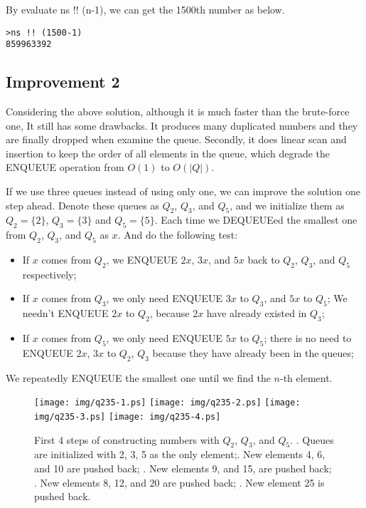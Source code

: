 \documentclass{article}
\begin{document}
By evaluate ns !! (n-1), we can get the 1500th number as
below.

\begin{verbatim}
>ns !! (1500-1)
859963392
\end{verbatim}

\subsection{Improvement 2}
Considering the above solution, although it is much faster than the brute-force one,
It still has some drawbacks. It produces many duplicated numbers and they are
finally dropped when examine the queue. Secondly, it does linear scan and insertion
to keep the order of all elements in the queue, which degrade the ENQUEUE operation
from $O(1)$ to $O(|Q|)$.

If we use three queues instead of using only one, we can improve the solution one
step ahead. Denote these queues as $Q_2$, $Q_3$, and $Q_5$, and we initialize
them as $Q_2=\{ 2 \}$, $Q_3 = \{ 3\}$ and $Q_5 = \{ 5 \}$. Each time we DEQUEUEed
the smallest one from $Q_2$, $Q_3$, and $Q_5$ as $x$. And do the following test:

\begin{itemize}
\item If $x$ comes from $Q_2$, we ENQUEUE $2x$, $3x$, and $5x$ back to
$Q_2$, $Q_3$, and $Q_5$ respectively;
\item If $x$ comes from $Q_3$, we only need ENQUEUE $3x$ to $Q_3$, and $5x$ to $Q_5$;
We needn't ENQUEUE $2x$ to $Q_2$, because $2x$ have already existed in $Q_3$;
\item If $x$ comes from $Q_5$, we only need ENQUEUE $5x$ to $Q_5$; there is
no need to ENQUEUE $2x$, $3x$ to $Q_2$, $Q_3$ because they have already been
in the queues;
\end{itemize}

We repeatedly ENQUEUE the smallest one until we find the $n$-th element.

\begin{figure}[htbp]
       \begin{center}
       	  \texttt{[image: img/q235-1.ps]}
       	  \texttt{[image: img/q235-2.ps]}
       	  \texttt{[image: img/q235-3.ps]}
       	  \texttt{[image: img/q235-4.ps]}
        \caption{First 4 steps of constructing numbers with $Q_2$, $Q_3$, and $Q_5$. . Queues are initialized with 2, 3, 5 as the only element;. New elements 4, 6, and 10 are pushed back; . New elements 9, and 15, are pushed back; . New elements 8, 12, and 20 are pushed back; . New element 25 is pushed back.} \label{fig:q235}
       \end{center}
\end{figure}
\end{document}
